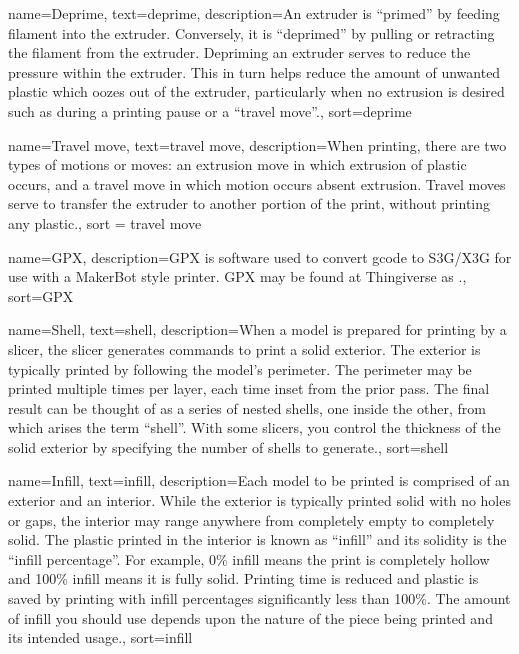{
        name={Deprime},
        text={deprime},
        description={An extruder is ``primed'' by feeding filament into the extruder.  Conversely, it is ``deprimed'' by pulling or retracting the filament from the extruder.  Depriming an extruder serves to reduce the pressure within the extruder.  This in turn helps reduce the amount of unwanted plastic which oozes out of the extruder, particularly when no extrusion is desired such as during a printing pause or a ``travel move''.},
        sort=deprime
}

{
        name={Travel move},
        text={travel move},
        description={When printing, there are two types of motions or moves: an extrusion move in which extrusion of plastic occurs, and a travel move in which motion occurs absent extrusion.  Travel moves serve to transfer the extruder to another portion of the print, without printing any plastic.},
        sort = {travel move}
}

{
        name={GPX},
        description={GPX is software used to convert gcode to S3G/X3G for use with a
MakerBot style printer.  GPX may be found at Thingiverse as .},
        sort=GPX
}

{
        name={Shell},
        text={shell},
        description={When a model is prepared for printing by a slicer, the slicer generates commands to print a solid exterior.  The exterior is typically printed by following the model's perimeter.  The perimeter may be printed multiple times per layer, each time inset from the prior pass.  The final result can be thought of as a series of nested shells, one inside the other, from which arises the term ``shell''.  With some slicers, you control the thickness of the solid exterior by specifying the number of shells to generate.},
        sort=shell
}

{
        name={Infill},
        text={infill},
        description={Each model to be printed is comprised of an exterior and an interior.  While the exterior is typically printed solid with no holes or gaps, the interior may range anywhere from completely empty to completely solid. The plastic printed in the interior is known as ``infill'' and its solidity is the ``infill percentage''.  For example, 0\% infill means the print is completely hollow and 100\% infill means it is fully solid.  Printing time is reduced and plastic is saved by printing with infill percentages significantly less than 100\%.  The amount of infill you should use depends upon the nature of the piece being printed and its intended usage.},
        sort=infill
}

